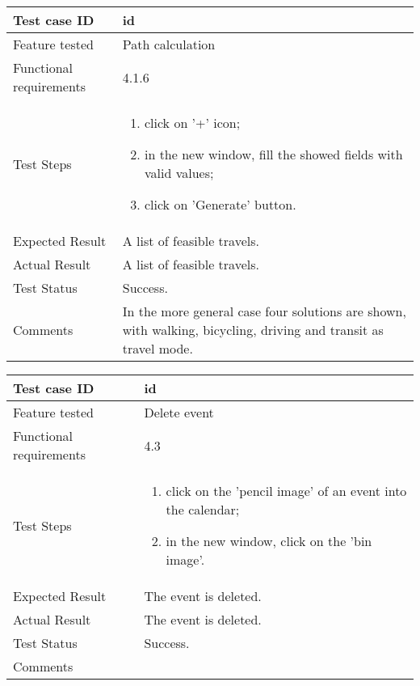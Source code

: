 \begin{table}[H]
	\begin{center}
		\begin{tabular}{ | p{} | p{} | }
		\hline
		Test case ID & id\\
		\hline
		Feature tested & Path calculation\\
		\hline
		Functional requirements & 4.1.6 \\
    	\hline
		Test Steps & 
			\begin{enumerate}
				\item click on '+' icon;
				\item in the new window, fill the showed fields with valid values;
				\item click on 'Generate' button.
			\end{enumerate} \\
		\hline
		Expected Result & A list of feasible travels.\\
		\hline
		Actual Result & A list of feasible travels.\\ 
		\hline
		Test Status & \color{ForestGreen}Success.\\ 
		\hline
		Comments & In the more general case four solutions are shown, with  walking, bicycling, driving and transit as travel mode. \\ 
		\hline
		
		\end{tabular}
	\end{center}
\end{table}

\begin{table}[H]
	\begin{center}
		\begin{tabular}{ | p{} | p{} | }
		\hline
		Test case ID & id\\
		\hline
		Feature tested & Delete event\\
		\hline
		Functional requirements & 4.3 \\
    	\hline
		Test Steps & 
			\begin{enumerate}
				\item click on the 'pencil image' of an event into the calendar;
				\item in the new window, click on the 'bin image'.
			\end{enumerate} \\
		\hline
		Expected Result & The event is deleted.\\
		\hline
		Actual Result & The event is deleted.\\ 
		\hline
		Test Status & \color{ForestGreen}Success.\\ 
		\hline
		Comments & \\ 
		\hline
		
		\end{tabular}
	\end{center}
\end{table}

